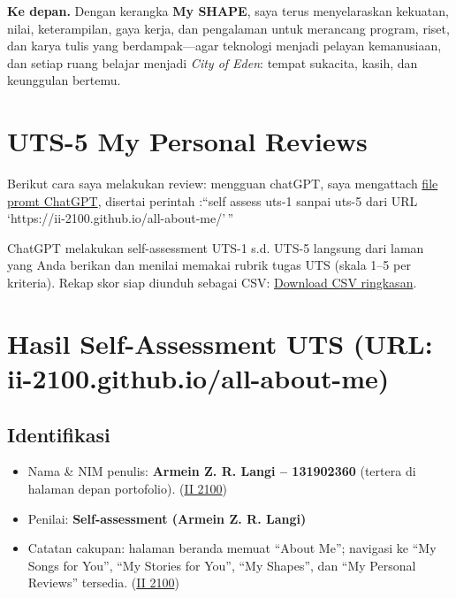 \documentclass[
  letterpaper,
  DIV=11,
  numbers=noendperiod]{scrreprt}
\providecommand{\tightlist}{%
  \setlength{\itemsep}{0pt}\setlength{\parskip}{0pt}}
\begin{document}
\textbf{Ke depan.} Dengan kerangka \textbf{My SHAPE}, saya terus
menyelaraskan kekuatan, nilai, keterampilan, gaya kerja, dan pengalaman
untuk merancang program, riset, dan karya tulis yang berdampak---agar
teknologi menjadi pelayan kemanusiaan, dan setiap ruang belajar menjadi
\emph{City of Eden}: tempat sukacita, kasih, dan keunggulan bertemu.


\chapter{UTS-5 My Personal Reviews}\label{uts-5-my-personal-reviews}

Berikut cara saya melakukan review: mengguan chatGPT, saya mengattach
\href{skor_uts.pdf}{file promt ChatGPT}, disertai perintah :``self
assess uts-1 sanpai uts-5 dari URL
`https://ii-2100.github.io/all-about-me/'\,''

ChatGPT melakukan self-assessment UTS-1 s.d. UTS-5 langsung dari laman
yang Anda berikan dan menilai memakai rubrik tugas UTS (skala 1--5 per
kriteria). Rekap skor siap diunduh sebagai CSV:
\href{sandbox:/mnt/data/UTS_self_assessment.csv}{Download CSV
ringkasan}.


\chapter{Hasil Self-Assessment UTS (URL:
ii-2100.github.io/all-about-me)}\label{hasil-self-assessment-uts-url-ii-2100.github.ioall-about-me}

\section{Identifikasi}\label{identifikasi}

\begin{itemize}
\tightlist
\item
  Nama \& NIM penulis: \textbf{Armein Z. R. Langi -- 131902360} (tertera
  di halaman depan portofolio).
  (\href{https://ii-2100.github.io/all-about-me/}{II 2100})
\item
  Penilai: \textbf{Self-assessment (Armein Z. R. Langi)}
\item
  Catatan cakupan: halaman beranda memuat ``About Me''; navigasi ke ``My
  Songs for You'', ``My Stories for You'', ``My Shapes'', dan ``My
  Personal Reviews'' tersedia.
  (\href{https://ii-2100.github.io/all-about-me/}{II 2100})
\end{itemize}
\end{document}
